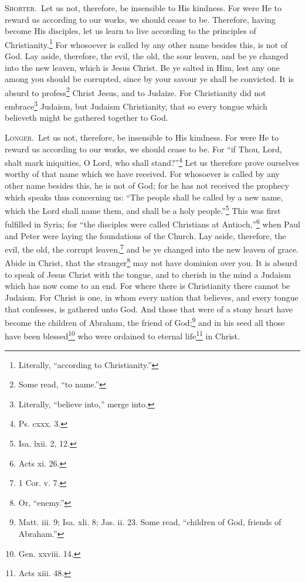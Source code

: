
\textsc{Shorter.}~Let us not, therefore, be insensible to His kindness. For were He to reward us according to our works, we should cease to be. Therefore, having become His disciples, let us learn to live according to the principles of Christianity.\footnote{Literally, “according to Christianity.”} For whosoever is called by any other name besides this, is not of God. Lay aside, therefore, the evil, the old, the sour leaven, and be ye changed into the new leaven, which is Jesus Christ. Be ye salted in Him, lest any one among you should be corrupted, since by your savour ye shall be convicted. It is absurd to profess\footnote{Some read, “to name.”} Christ Jesus, and to Judaize. For Christianity did not embrace\footnote{Literally, “believe into,” merge into.} Judaism, but Judaism Christianity, that so every tongue which believeth might be gathered together to God.

\textsc{Longer.}~Let us not, therefore, be insensible to His kindness. For were He to reward us according to our works, we should cease to be. For “if Thou, Lord, shalt mark iniquities, O Lord, who shall stand?”\footnote{Ps. cxxx. 3.} Let us therefore prove ourselves worthy of that name which we have received. For whosoever is called by any other name besides this, he is not of God; for he has not received the prophecy which speaks thus concerning us: “The people shall be called by a new name, which the Lord shall name them, and shall be a holy people.”\footnote{Isa. lxii. 2, 12.} This was first fulfilled in Syria; for “the disciples were called Christians at Antioch,”\footnote{Acts xi. 26.} when Paul and Peter were laying the foundations of the Church. Lay aside, therefore, the evil, the old, the corrupt leaven,\footnote{1 Cor. v. 7.} and be ye changed into the new leaven of grace. Abide in Christ, that the stranger\footnote{Or, “enemy.”} may not have dominion over you. It is absurd to speak of Jesus Christ with the tongue, and to cherish in the mind a Judaism which has now come to an end. For where there is Christianity there cannot be Judaism. For Christ is one, in whom every nation that believes, and every tongue that confesses, is gathered unto God. And those that were of a stony heart have become the children of Abraham, the friend of God;\footnote{Matt. iii. 9; Isa. xli. 8; Jas. ii. 23. Some read, “children of God, friends of Abraham.”} and in his seed all those have been blessed\footnote{Gen. xxviii. 14.} who were ordained to eternal life\footnote{Acts xiii. 48.} in Christ.

